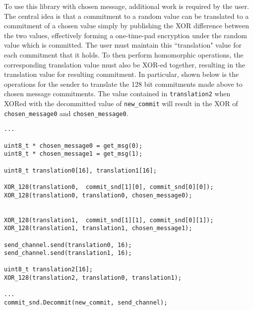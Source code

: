 To use this library with chosen message, additional work is required by the user. The central idea is that a commitment to a random value can be translated to a commitment of a chosen value simply by publishing the XOR difference between the two values, effectively forming a one-time-pad encryption under the random value which is committed. The user must maintain this ``translation" value for each commitment that it holds. To then perform homomorphic operations, the corresponding translation value must also be XOR-ed together, resulting in the translation value for resulting commitment. In particular, shown below is the operations for the sender to translate the 128 bit commitments made above to chosen message commitments. The value contained in \texttt{translation2} when XORed with the decommitted value of \texttt{new\_commit} will result in the XOR of \texttt{chosen\_message0} and \texttt{chosen\_message0}.
\begin{lstlisting}     
...

uint8_t * chosen_message0 = get_msg(0);
uint8_t * chosen_message1 = get_msg(1);

uint8_t translation0[16], translation1[16];

XOR_128(translation0,  commit_snd[1][0], commit_snd[0][0]);
XOR_128(translation0, translation0, chosen_message0);


XOR_128(translation1,  commit_snd[1][1], commit_snd[0][1]);
XOR_128(translation1, translation1, chosen_message1);

send_channel.send(translation0, 16);
send_channel.send(translation1, 16);

uint8_t translation2[16];
XOR_128(translation2, translation0, translation1);

...
commit_snd.Decommit(new_commit, send_channel);
\end{lstlisting}

